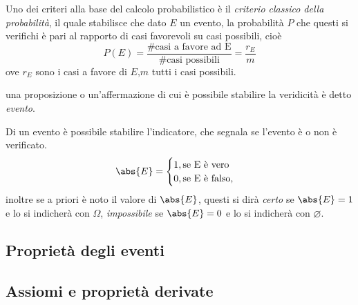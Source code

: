 \documentclass{subfiles}
\begin{document}
Uno dei criteri alla base del calcolo probabilistico è il \emph{criterio classico della probabilità},
il quale stabilisce che dato \(E\) un evento, la probabilità \(P\) che questi si verifichi è pari al rapporto di casi favorevoli su casi possibili, cioè
\[
    P(E) = \frac{\# \text{casi a favore ad E}}{\# \text{casi possibili}} = \frac{r_{E}}{m}
\]
ove \(r_{E}\) sono i casi a favore di \(E \text{,} m\) tutti i casi possibili.

\begin{Definition*}
    una proposizione o un'affermazione di cui è possibile stabilire la veridicità è detto \emph{evento}.
\end{Definition*}
\noindent
Di un evento è possibile stabilire l'indicatore, che segnala se l'evento è o non è verificato.
\[
    \abs{E} = \begin{cases}
        1, \text{se E è vero}   \\
        0, \text{se E è falso}, \\
    \end{cases}
\]
inoltre se a priori è noto il valore di \(\abs{E}\), questi si dirà \emph{certo} se \(\abs{E} = 1\) e lo si indicherà con \(\Omega\),
\emph{impossibile} se \(\abs{E} = 0\) e lo si indicherà con \(\varnothing\).

\subsection{Proprietà degli eventi}


\subsection{Assiomi e proprietà derivate}

\end{document}

